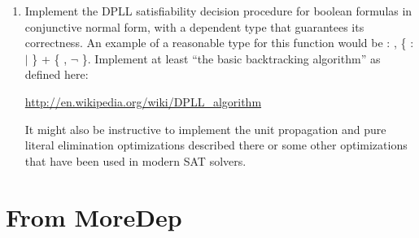 \documentclass[12pt]{report}
\begin{document}
\begin{enumerate}
\begin{enumerate}
\end{enumerate} 


\item Implement the DPLL satisfiability decision procedure for boolean formulas in conjunctive normal form, with a dependent type that guarantees its correctness.  An example of a reasonable type for this function would be \coqdockw{\ensuremath{\forall}}  : , \{ :  \ensuremath{|}   \} + \{\coqdockw{\ensuremath{\forall}} , \ensuremath{\lnot}   \}.  Implement at least ``the basic backtracking algorithm'' as defined here:
  \begin{center}\url{http://en.wikipedia.org/wiki/DPLL_algorithm}\end{center}
  
It might also be instructive to implement the unit propagation and pure literal elimination optimizations described there or some other optimizations that have been used in modern SAT solvers.


\end{enumerate} 

\section{From MoreDep}
\end{document}
